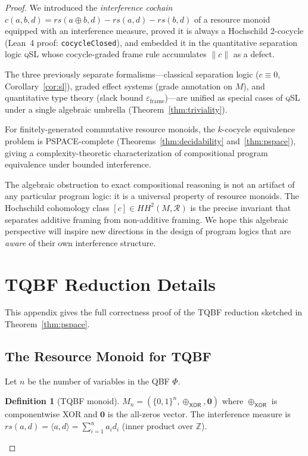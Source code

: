 \documentclass[acmsmall,sigplan,anonymous,review,screen]{acmart}
\theoremstyle{plain}
\theoremstyle{definition}
\newtheorem{definition}[theorem]{Definition}
\newcommand{\qSL}{\textsc{qSL}\xspace}
\newcommand{\rs}{\mathit{rs}}
\newcommand{\HH}[2]{H\!H^{#1}(#2)}
\newcommand{\norm}[1]{\|#1\|}
\newcommand{\defect}{\varepsilon}
\newcommand{\lean}[1]{\texttt{#1}}
\begin{document}
\begin{proof}
We introduced the \emph{interference cochain} $c(a, b, d) =
\rs(a \oplus b, d) - \rs(a, d) - \rs(b, d)$ of a resource monoid
equipped with an interference measure, proved it is always a Hochschild
2-cocycle (Lean~4 proof: \lean{cocycleClosed}), and embedded it in the
quantitative separation logic \qSL whose cocycle-graded frame rule
accumulates $\norm{c}$ as a defect.

The three previously separate formalisms---classical separation logic
($c \equiv 0$, Corollary~\ref{cor:sl}), graded effect systems (grade
annotation on $M$), and quantitative type theory (slack bound
$\defect_{\mathrm{frame}}$)---are unified as special cases of \qSL
under a single algebraic umbrella (Theorem~\ref{thm:triviality}).

For finitely-generated commutative resource monoids, the $k$-cocycle
equivalence problem is PSPACE-complete (Theorems~\ref{thm:decidability}
and~\ref{thm:pspace}), giving a complexity-theoretic characterization
of compositional program equivalence under bounded interference.

The algebraic obstruction to exact compositional reasoning is not an
artifact of any particular program logic: it is a universal property of
resource monoids.  The Hochschild cohomology class
$[c] \in \HH{2}{M, \mathcal{R}}$ is the precise invariant that separates
additive framing from non-additive framing.  We hope this algebraic
perspective will inspire new directions in the design of program logics
that are \emph{aware} of their own interference structure.

\appendix
\section{TQBF Reduction Details}
\label{appendix:tqbf}

This appendix gives the full correctness proof of the TQBF reduction
sketched in Theorem~\ref{thm:pspace}.

\subsection{The Resource Monoid for TQBF}
\label{appendix:monoid}

Let $n$ be the number of variables in the QBF $\Phi$.
\begin{definition}[TQBF monoid]
  $M_n = (\{0,1\}^n, \oplus_{\mathsf{XOR}}, \mathbf{0})$ where
  $\oplus_{\mathsf{XOR}}$ is componentwise XOR and $\mathbf{0}$ is the
  all-zeros vector.  The interference measure is
  $\rs(a, d) = \langle a, d \rangle = \sum_{i=1}^n a_i d_i$
  (inner product over $\mathbb{Z}$).
\end{definition}


\end{proof}
\end{document}
